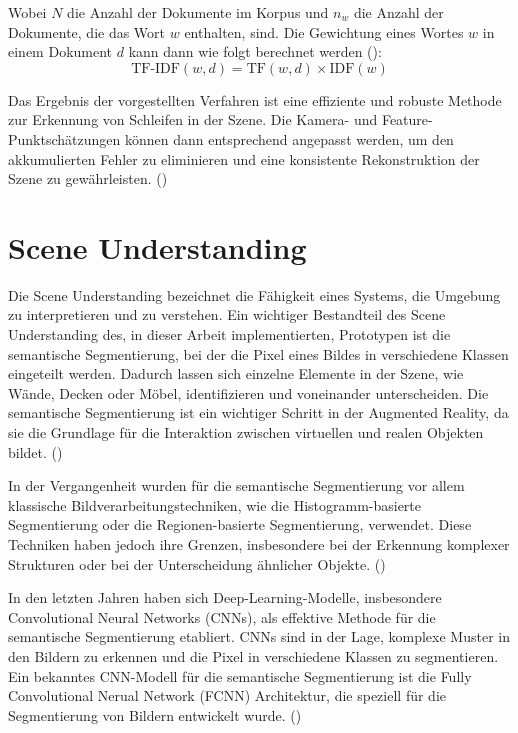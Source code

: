 Wobei \( N \) die Anzahl der Dokumente im Korpus und \( n_w \) die Anzahl der Dokumente, die das Wort \( w \) enthalten, sind. Die Gewichtung eines Wortes \( w \) in einem Dokument \( d \) kann dann wie folgt berechnet werden (\cite{gao2021vSLAM}):
\begin{equation}
    \text{TF-IDF}(w, d) = \text{TF}(w, d) \times \text{IDF}(w)
\end{equation}

Das Ergebnis der vorgestellten Verfahren ist eine effiziente und robuste Methode zur Erkennung von Schleifen in der Szene. Die Kamera- und Feature-Punktschätzungen können dann entsprechend angepasst werden, um den akkumulierten Fehler zu eliminieren und eine konsistente Rekonstruktion der Szene zu gewährleisten. (\cite{gao2021vSLAM})

\section{Scene Understanding}

Die Scene Understanding bezeichnet die Fähigkeit eines Systems, die Umgebung zu interpretieren und zu verstehen. Ein wichtiger Bestandteil des Scene Understanding des, in dieser Arbeit implementierten, Prototypen ist die semantische Segmentierung, bei der die Pixel eines Bildes in verschiedene Klassen eingeteilt werden. Dadurch lassen sich einzelne Elemente in der Szene, wie Wände, Decken oder Möbel, identifizieren und voneinander unterscheiden. Die semantische Segmentierung ist ein wichtiger Schritt in der Augmented Reality, da sie die Grundlage für die Interaktion zwischen virtuellen und realen Objekten bildet. (\cite{szeliski2022computerVision})

In der Vergangenheit wurden für die semantische Segmentierung vor allem klassische Bildverarbeitungstechniken, wie die Histogramm-basierte Segmentierung oder die Regionen-basierte Segmentierung, verwendet. Diese Techniken haben jedoch ihre Grenzen, insbesondere bei der Erkennung komplexer Strukturen oder bei der Unterscheidung ähnlicher Objekte. (\cite{szeliski2022computerVision})

In den letzten Jahren haben sich Deep-Learning-Modelle, insbesondere Convolutional Neural Networks (CNNs), als effektive Methode für die semantische Segmentierung etabliert. CNNs sind in der Lage, komplexe Muster in den Bildern zu erkennen und die Pixel in verschiedene Klassen zu segmentieren. Ein bekanntes CNN-Modell für die semantische Segmentierung ist die Fully Convolutional Nerual Network (FCNN) Architektur, die speziell für die Segmentierung von Bildern entwickelt wurde. (\cite{long2014fcnn})

